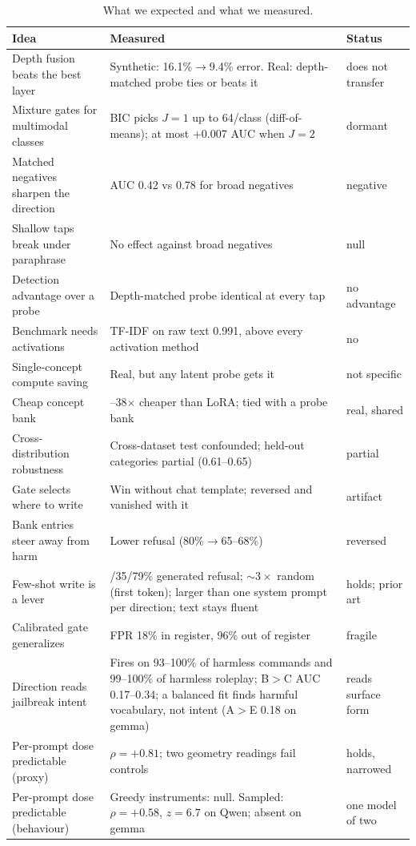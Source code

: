 \documentclass[11pt]{article}
\begin{document}
\begin{table}[t]
\centering
\small
\caption{What we expected and what we measured.}
\label{tab:ledger}
\begin{tabularx}{\textwidth}{>{\raggedright\arraybackslash}p{3.4cm}>{\raggedright\arraybackslash}X>{\raggedright\arraybackslash}p{2.6cm}}
\toprule
Idea & Measured & Status \\
\midrule
Depth fusion beats the best layer & Synthetic: 16.1\%$\to$9.4\% error. Real: depth-matched probe ties or beats it & does not transfer \\
Mixture gates for multimodal classes & BIC picks $J=1$ up to 64/class (diff-of-means); at most +0.007 AUC when $J=2$ & dormant \\
Matched negatives sharpen the direction & AUC 0.42 vs 0.78 for broad negatives & negative \\
Shallow taps break under paraphrase & No effect against broad negatives & null \\
Detection advantage over a probe & Depth-matched probe identical at every tap & no advantage \\
Benchmark needs activations & TF-IDF on raw text 0.991, above every activation method & no \\
Single-concept compute saving & Real, but any latent probe gets it & not specific \\
Cheap concept bank & 30--38$\times$ cheaper than LoRA; tied with a probe bank & real, shared \\
Cross-distribution robustness & Cross-dataset test confounded; held-out categories partial (0.61--0.65) & partial \\
Gate selects where to write & Win without chat template; reversed and vanished with it & artifact \\
Bank entries steer away from harm & Lower refusal (80\%$\to$65--68\%) & reversed \\
Few-shot write is a lever & 64/35/79\% generated refusal; ${\sim}3\times$ random (first token); larger than one system prompt per direction; text stays fluent & holds; prior art \\
Calibrated gate generalizes & FPR 18\% in register, 96\% out of register & fragile \\
Direction reads jailbreak intent & Fires on 93--100\% of harmless commands and 99--100\% of harmless roleplay; B$>$C AUC 0.17--0.34; a balanced fit finds harmful vocabulary, not intent (A$>$E 0.18 on gemma) & reads surface form \\
Per-prompt dose predictable (proxy) & $\rho=+0.81$; two geometry readings fail controls & holds, narrowed \\
Per-prompt dose predictable (behaviour) & Greedy instruments: null. Sampled: $\rho=+0.58$, $z=6.7$ on Qwen; absent on gemma & one model of two \\
\bottomrule
\end{tabularx}
\end{table}
\end{document}
